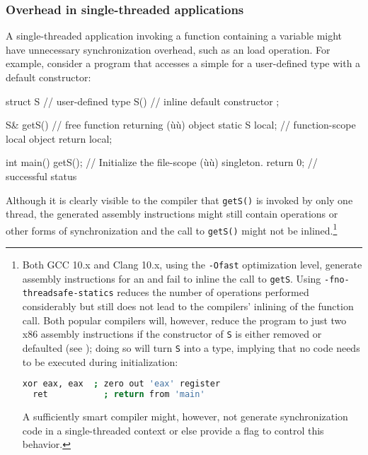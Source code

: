 \subsubsection[Overhead in single-threaded applications]{Overhead in single-threaded applications}\label{overhead-in-single-threaded-applications}

A single-threaded application invoking a function containing a
  variable might
have unnecessary synchronization overhead, such as an 
load operation. For example, consider a program that accesses
a simple   for a user-defined type with a
 default constructor:

\begin{emcppslisting}
struct S  // user-defined type
{
    S() { }  // inline default constructor
};

S& getS()  // free function returning (ù{}ù) object
{
    static S local;  // function-scope local object
    return local;
}

int main()
{
    getS();    // Initialize the file-scope (ù{}ù) singleton.
    return 0;  // successful status
}
\end{emcppslisting}

\noindent Although it is clearly visible to the compiler that \lstinline!getS()! is
invoked by only one thread, the generated assembly instructions might
still contain  operations or other forms of
synchronization and the call to \lstinline!getS()! might not be 
inlined.{\cprotect\footnote{Both GCC 10.x and Clang 10.x, using the
\lstinline!-Ofast! optimization level, generate assembly instructions for
an  and fail to inline the call
to \lstinline!getS!. Using \lstinline!-fno-threadsafe-statics! reduces the
number of operations performed considerably but still does not lead to
the compilers' inlining of the function call. Both popular compilers
will, however, reduce the program to just two x86 assembly
instructions if the  constructor of \lstinline!S!
  is either removed or defaulted (see );
  doing so will turn \lstinline!S! into a 
  type, implying that no code needs to be executed during
  initialization:

  \begin{lstlisting}[language=bash,style=footcodeplain]
  xor eax, eax  ; zero out 'eax' register
  ret           ; return from 'main'
  \end{lstlisting}

\noindent A sufficiently smart compiler might, however, not generate
  synchronization code in a single-threaded context or else provide a
  flag to control this behavior.
  }}

